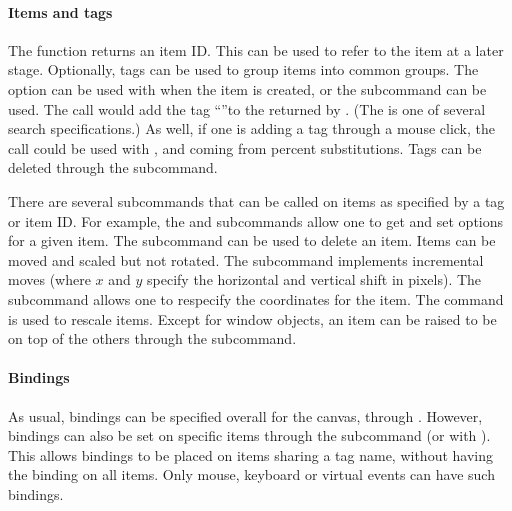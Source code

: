 

\paragraph{Items and tags}
The  function returns an item ID. This can be
used to refer to the item at a later stage. Optionally, tags can be
used to group items into common groups. The  option can be
used with  when the item is created, or the
 subcommand can be used. The call
 would add the tag
``''to the  returned by . (The
 is one of several search specifications.) As well, if
one is adding a tag through a mouse click, the call  could be used with , 
and  coming from percent substitutions. Tags can be deleted
through the  subcommand.

There are several subcommands that can be called on items as specified
by a tag or item ID. For example, the 
and  subcommands allow one to get
and set options for a given item. The
 subcommand can be used to
delete an item. Items can be moved and scaled but not rotated. The
 subcommand implements
incremental moves (where $x$ and $y$ specify the horizontal and
vertical shift in pixels). The subcommand
 allows one
to respecify the coordinates for the item. The
 command is used to rescale items. Except
for window objects, an item can be raised to be on top of the others
through the  subcommand.



\paragraph{Bindings}
As usual, bindings can be specified overall for the canvas, through
. However, bindings can also be set on specific items
through the subcommand  (or with ). This allows bindings to be
placed on items sharing a tag name, without having the binding on all
items. Only mouse, keyboard or virtual events can have such bindings.

